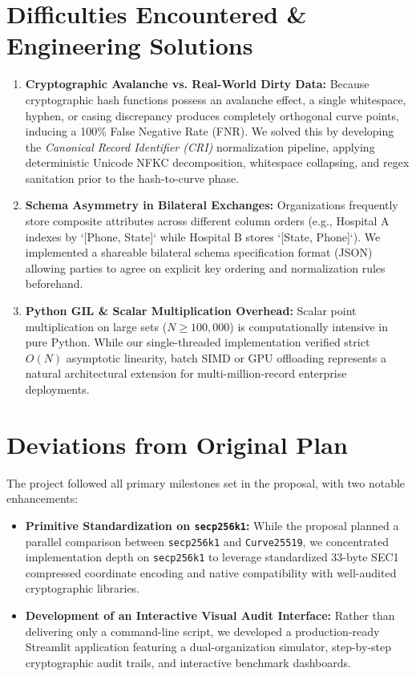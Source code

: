 \documentclass[10pt,a4paper]{article}
\begin{document}
\section{Difficulties Encountered \& Engineering Solutions}
\begin{enumerate}
    \item \textbf{Cryptographic Avalanche vs. Real-World Dirty Data:}
    Because cryptographic hash functions possess an avalanche effect, a single whitespace, hyphen, or casing discrepancy produces completely orthogonal curve points, inducing a 100\% False Negative Rate (FNR). We solved this by developing the \emph{Canonical Record Identifier (CRI)} normalization pipeline, applying deterministic Unicode NFKC decomposition, whitespace collapsing, and regex sanitation prior to the hash-to-curve phase.
    \item \textbf{Schema Asymmetry in Bilateral Exchanges:}
    Organizations frequently store composite attributes across different column orders (e.g., Hospital A indexes by `[Phone, State]` while Hospital B stores `[State, Phone]`). We implemented a shareable bilateral schema specification format (JSON) allowing parties to agree on explicit key ordering and normalization rules beforehand.
    \item \textbf{Python GIL \& Scalar Multiplication Overhead:}
    Scalar point multiplication on large sets ($N \ge 100{,}000$) is computationally intensive in pure Python. While our single-threaded implementation verified strict $O(N)$ asymptotic linearity, batch SIMD or GPU offloading represents a natural architectural extension for multi-million-record enterprise deployments.
\end{enumerate}

\section{Deviations from Original Plan}
The project followed all primary milestones set in the proposal, with two notable enhancements:
\begin{itemize}
    \item \textbf{Primitive Standardization on \texttt{secp256k1}:} While the proposal planned a parallel comparison between \texttt{secp256k1} and \texttt{Curve25519}, we concentrated implementation depth on \texttt{secp256k1} to leverage standardized 33-byte SEC1 compressed coordinate encoding and native compatibility with well-audited cryptographic libraries.
    \item \textbf{Development of an Interactive Visual Audit Interface:} Rather than delivering only a command-line script, we developed a production-ready Streamlit application featuring a dual-organization simulator, step-by-step cryptographic audit trails, and interactive benchmark dashboards.
\end{itemize}
\end{document}
